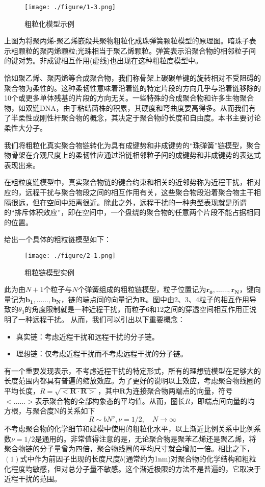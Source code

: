 \documentclass[UTF8]{ctexart}
\begin{document}
\begin{figure}[h]
\centering
\texttt{[image: ./figure/1-3.png]}
\caption{粗粒化模型示例}
\end{figure}

上图为将聚丙烯-聚乙烯嵌段共聚物粗粒化成珠弹簧颗粒模型的原理图。暗珠子表示粗颗粒的聚丙烯颗粒;光珠相当于聚乙烯颗粒。弹簧表示沿聚合物的相邻粒子间的键对势。非成键相互作用(虚线)也出现在这种粗粒度模型中。

恰如聚乙烯、聚丙烯等合成聚合物，我们称骨架上碳碳单键的旋转相对不受阻碍的聚合物为柔性的。这种柔韧性意味着沿着链的特定片段的方向几乎与沿着链移除的10个或更多单体残基的片段的方向无关。一些特殊的合成聚合物和许多生物聚合物，如双链DNA，由于粘结菌株的积累，其硬度和弯曲度要高得多。从而我们有了半柔性或刚性杆聚合物的概念，其决定于聚合物的长度和自由度。本书主要讨论柔性大分子。

我们将粗粒化真实聚合物链转化为具有成键势和非成键势的“珠弹簧”链模型，聚合物骨架在介观尺度上的柔韧性应通过沿链相邻粒子间的成键势和非成键势的表达式表现出来。

在粗粒度链模型中，真实聚合物链的键合约束和相关的近邻势称为近程干扰，相对应的，远程干扰与聚合物段之间的相互作用有关，这些聚合物段沿着聚合物主干相隔很远，但在空间中距离很近。除此之外，远程干扰的一种典型表现就是所谓的“排斥体积效应”，即在空间中，一个盘绕的聚合物的任意两个片段不能占据相同的位置。

给出一个具体的粗粒链模型如下：

\begin{figure}[h]
\centering
\texttt{[image: ./figure/2-1.png]}
\caption{粗粒链模型实例}
\end{figure}

此为由$N+1$个粒子与$N$个弹簧组成的粗粒链模型，粒子位置记为$\mathbf{r_0},……,\mathbf{r_N}$，键向量记为$\mathbf{b_1},……,\mathbf{b_N}$，链的端点间的向量记为$\mathbf{R}$。图中由2、3、4粒子的相互作用导致的$\theta_3$的角度限制就是一种近程干扰，而粒子6和12之间的穿透空间相互作用正说明了一种远程干扰。
从而，我们可以引出以下重要概念：
\begin{itemize}
	\item 真实链：考虑近程干扰和远程干扰的分子链。
	\item 理想链：仅考虑近程干扰而不考虑远程干扰的分子链。
\end{itemize}

有一个重要发现表示，不考虑近程干扰的特定形式，所有的理想链模型在足够大的长度范围内都具有普遍的缩放效应。为了更好的说明以上效应，考虑聚合物线圈的平均长度，$R=\sqrt{<\mathbf{R}\cdot \mathbf{R}>}$，其中$\mathbf{R}$为连接聚合物两端点的向量，符号$<……>$表示聚合物的全部构象态的平均值。从而，圈长$R$，即端点间向量的均方根，与聚合度N的关系如下
\begin{equation}
R \sim b N ^ { \nu } , \nu = 1 / 2 , \quad N \rightarrow \infty
\end{equation}
不考虑聚合物的化学细节和建模中使用的粗粒化水平，以上渐近比例关系中比例系数$\nu = 1/2$是通用的。非常值得注意的是，无论聚合物是聚苯乙烯还是聚乙烯，将聚合物链的分子量曾为四倍，聚合物线圈的平均尺寸就会增加一倍。相比之下，$(1)$式中作为前因子出现的长度尺度$b$(通常约为1nm)对聚合物的化学结构和粗粒化程度均敏感，但对总分子量不敏感。这个渐近极限的方法不是普遍的，它取决于近程干扰的范围。
\end{document}
